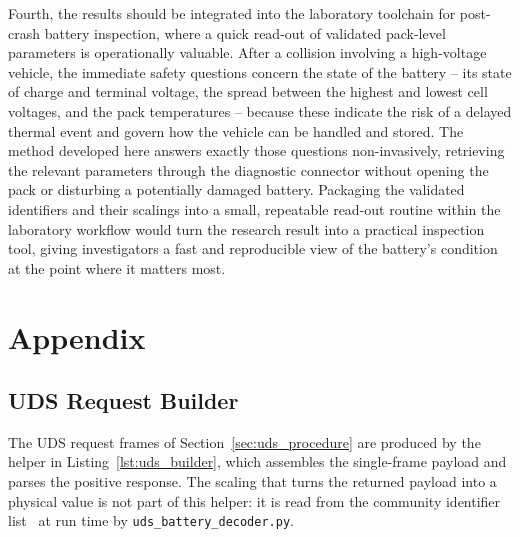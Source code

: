 \documentclass[11pt,a4paper,oneside,parskip=half]{scrreprt}
\begin{document}
Fourth, the results should be integrated into the laboratory toolchain for post-crash battery inspection, where a quick read-out of validated pack-level parameters is operationally valuable. After a collision involving a high-voltage vehicle, the immediate safety questions concern the state of the battery -- its state of charge and terminal voltage, the spread between the highest and lowest cell voltages, and the pack temperatures -- because these indicate the risk of a delayed thermal event and govern how the vehicle can be handled and stored. The method developed here answers exactly those questions non-invasively, retrieving the relevant parameters through the diagnostic connector without opening the pack or disturbing a potentially damaged battery. Packaging the validated identifiers and their scalings into a small, repeatable read-out routine within the laboratory workflow would turn the research result into a practical inspection tool, giving investigators a fast and reproducible view of the battery's condition at the point where it matters most.

\clearpage



\appendix
\chapter{Appendix}
\label{app:code}

\section{UDS Request Builder}
The UDS request frames of Section~\ref{sec:uds_procedure} are produced by the helper in Listing~\ref{lst:uds_builder}, which assembles the single-frame payload and parses the positive response. The scaling that turns the returned payload into a physical value is not part of this helper: it is read from the community identifier list~\cite{vwmebpidlist} at run time by \texttt{uds\_battery\_decoder.py}.
\end{document}
